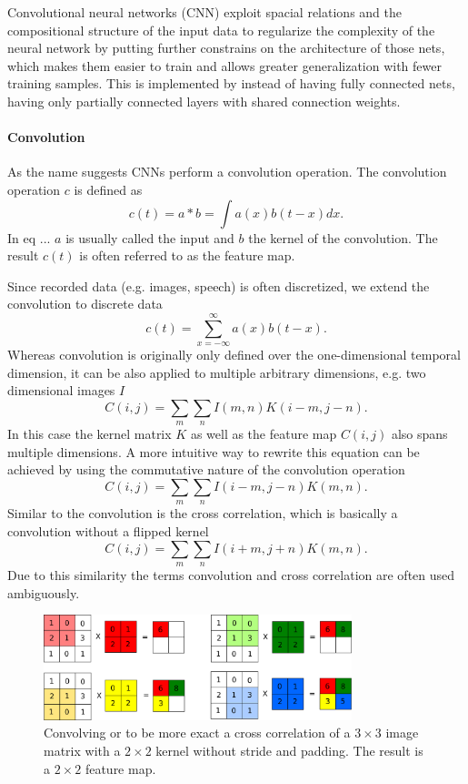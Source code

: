 Convolutional neural networks (CNN) exploit spacial relations and the compositional structure of the input data to regularize the complexity of the neural network by putting further constrains on the architecture of those nets, which makes them easier to train and allows greater generalization with fewer training samples.
This is implemented by instead of having fully connected nets, having only partially connected layers 
with shared connection weights.    

\paragraph{Convolution}

As the name suggests CNNs perform a convolution operation. The convolution operation $c$ is defined as
\[
c(t) = a * b = \int a(x)b(t-x) dx.
\]
In eq ... $a$ is usually called the input and $b$ the kernel of the convolution. The result $c(t)$ is often referred to as the feature map.

Since recorded data (e.g. images, speech) is often discretized, we extend the convolution to discrete data
\[
c(t) = \sum_{x = - \infty}^{\infty} a(x)b(t-x).
\]
Whereas convolution is originally only defined over the one-dimensional temporal dimension, it can be also applied to multiple arbitrary dimensions, e.g. two dimensional images $I$
\[
C(i,j) = \sum_m \sum_n I(m,n) K(i - m, j -n).
\]
In this case the kernel matrix $K$ as well as the feature map $C(i,j)$ also spans multiple dimensions.
A more intuitive way to rewrite this equation can be achieved by using the commutative nature of the convolution operation
\[
C(i,j) = \sum_m \sum_n I(i - m,j - n) K(m, n).
\]
Similar to the convolution is the cross correlation, which is basically a convolution without a flipped kernel
\[
C(i,j) = \sum_m \sum_n I(i + m,j + n) K(m, n).
\]
Due to this similarity the terms convolution and cross correlation are often used ambiguously.

\begin{figure}
	\centering
    	\includegraphics[width=0.8\textwidth]{imgs/convolution.png} 
    \caption{Convolving or to be more exact a cross correlation of a $3\times3$ image matrix with a $2\times2$ kernel without stride and padding. The result is a $2\times2$ feature map.}
	\label{fig:conv}
\end{figure}

